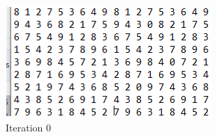 \documentclass{article}
\begin{document}
    \begin{figure}[!htb]
      \includegraphics[width=\linewidth]{iteration1.png}
      \caption{Iteration 0}\label{fig:awesome_image1}
    \endminipage\hfill
      \includegraphics[width=\linewidth]{iteration2.png}

\end{figure}
\end{document}
